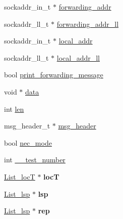 \begin{DoxyCompactItemize}
\item 
sockaddr\-\_\-in\-\_\-t $\ast$ \hyperlink{structpublic__ev__arg_aa6faee62a89e9c23d44e7c7e17041ae9}{forwarding\-\_\-addr}
\item 
sockaddr\-\_\-ll\-\_\-t $\ast$ \hyperlink{structpublic__ev__arg_aac387a358c08c7677ab02f5fb63737f4}{forwarding\-\_\-addr\-\_\-ll}
\item 
sockaddr\-\_\-in\-\_\-t $\ast$ \hyperlink{structpublic__ev__arg_ac375febf0d00c25f18262257963d0b4a}{local\-\_\-addr}
\item 
sockaddr\-\_\-ll\-\_\-t $\ast$ \hyperlink{structpublic__ev__arg_a2f32a405cea10994470b8095471b8133}{local\-\_\-addr\-\_\-ll}
\item 
bool \hyperlink{structpublic__ev__arg_a8ab1326ed333f4d4678ed8fa30633376}{print\-\_\-forwarding\-\_\-message}
\item 
void $\ast$ \hyperlink{structpublic__ev__arg_a0ac78f083e007986eea76410d4d0d3d5}{data}
\item 
int \hyperlink{structpublic__ev__arg_a53c7bdba35e8c9cdb0cc7d0e1c5f9d20}{len}
\item 
msg\-\_\-header\-\_\-t $\ast$ \hyperlink{structpublic__ev__arg_a6af12c28c65ebae88491cb1c5f4e20c8}{msg\-\_\-header}
\item 
bool \hyperlink{structpublic__ev__arg_a7587ccf7cff367692653f0232f8e3ea2}{nec\-\_\-mode}
\item 
int \hyperlink{structpublic__ev__arg_a9581eaf6fe5eb5ed596b097e15d24f7b}{\-\_\-\-\_\-test\-\_\-number}
\item 
\hypertarget{structpublic__ev__arg_a9363e9e0335766eee1145c7e2c799cbf}{\hyperlink{structList__locT}{\-List\-\_\-loc\-T} $\ast$ {\bfseries loc\-T}}\label{structpublic__ev__arg_a9363e9e0335766eee1145c7e2c799cbf}

\item 
\hypertarget{structpublic__ev__arg_a682eec2f372a8b118f728bedcca5c49b}{\hyperlink{structList__lsp}{\-List\-\_\-lsp} $\ast$ {\bfseries lsp}}\label{structpublic__ev__arg_a682eec2f372a8b118f728bedcca5c49b}

\item 
\hypertarget{structpublic__ev__arg_aeae76042363ea9b0a3cae8a5d3a5fbf6}{\hyperlink{structList__lsp}{\-List\-\_\-lsp} $\ast$ {\bfseries rep}}\label{structpublic__ev__arg_aeae76042363ea9b0a3cae8a5d3a5fbf6}

\end{DoxyCompactItemize}


